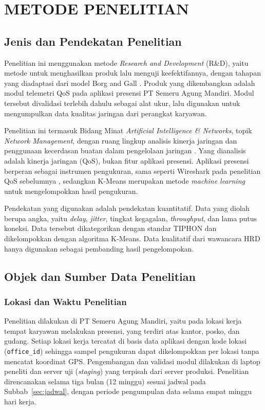 \chapter{METODE PENELITIAN}

\section{Jenis dan Pendekatan Penelitian}
Penelitian ini menggunakan metode \textit{Research and Development} (R\&D), yaitu metode untuk menghasilkan produk lalu menguji keefektifannya, dengan tahapan yang diadaptasi dari model Borg and Gall \parencite{jamaludin2024borggall}. Produk yang dikembangkan adalah modul telemetri QoS pada aplikasi presensi PT Semeru Agung Mandiri. Modul tersebut divalidasi terlebih dahulu sebagai alat ukur, lalu digunakan untuk mengumpulkan data kualitas jaringan dari perangkat karyawan.

Penelitian ini termasuk Bidang Minat \textit{Artificial Intelligence \& Networks}, topik \textit{Network Management}, dengan ruang lingkup analisis kinerja jaringan dan penggunaan kecerdasan buatan dalam pengelolaan jaringan \parencite{fti2026pedoman}. Yang dianalisis adalah kinerja jaringan (QoS), bukan fitur aplikasi presensi. Aplikasi presensi berperan sebagai instrumen pengukuran, sama seperti Wireshark pada penelitian QoS sebelumnya \parencite{rosid2023qos,fiqria2024qos}, sedangkan K-Means merupakan metode \textit{machine learning} untuk mengelompokkan hasil pengukuran.

Pendekatan yang digunakan adalah pendekatan kuantitatif. Data yang diolah berupa angka, yaitu \textit{delay}, \textit{jitter}, tingkat kegagalan, \textit{throughput}, dan lama putus koneksi. Data tersebut dikategorikan dengan standar TIPHON dan dikelompokkan dengan algoritma K-Means. Data kualitatif dari wawancara HRD hanya digunakan sebagai pembanding hasil pengelompokan.

\section{Objek dan Sumber Data Penelitian}

\subsection{Lokasi dan Waktu Penelitian}
Penelitian dilakukan di PT Semeru Agung Mandiri, yaitu pada lokasi kerja tempat karyawan melakukan presensi, yang terdiri atas kantor, posko, dan gudang. Setiap lokasi kerja tercatat di basis data aplikasi dengan kode lokasi (\texttt{office\_id}) sehingga sampel pengukuran dapat dikelompokkan per lokasi tanpa mencatat koordinat GPS. Pengembangan dan validasi modul dilakukan di laptop peneliti dan server uji (\textit{staging}) yang terpisah dari server produksi. Penelitian direncanakan selama tiga bulan (12 minggu) sesuai jadwal pada Subbab~\ref{sec:jadwal}, dengan periode pengumpulan data selama empat minggu hari kerja.

